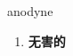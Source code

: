 
\begin{frame}
{\huge anodyne}
\begin{center}
\begin{enumerate}\Large
  \item \textbf{无害的}
\end{enumerate}
\end{center}
\end{frame}
